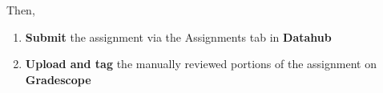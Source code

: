 \documentclass[11pt]{article}
\providecommand{\tightlist}{%
      \setlength{\itemsep}{0pt}\setlength{\parskip}{0pt}}
\begin{document}
Then,

\begin{enumerate}
\def\labelenumi{\arabic{enumi}.}
\tightlist
\item
  \textbf{Submit} the assignment via the Assignments tab in
  \textbf{Datahub}
\item
  \textbf{Upload and tag} the manually reviewed portions of the
  assignment on \textbf{Gradescope}
\end{enumerate}


    
    
    
    
\end{document}
